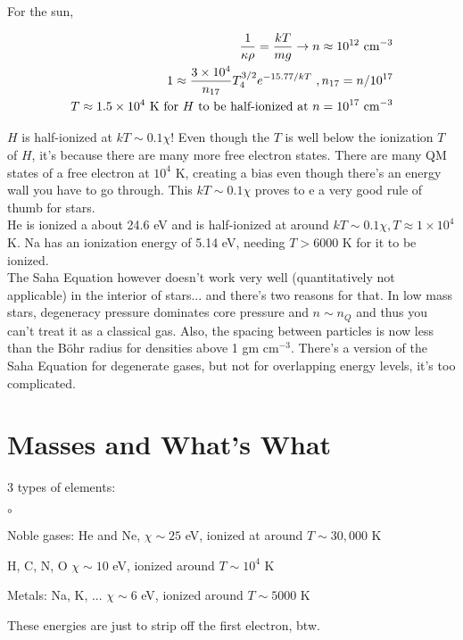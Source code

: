 For the sun,

\begin{align}
\frac{1}{\kappa \rho} = \frac{kT}{mg} \rightarrow n\approx 10^{12} \text{ cm}^{-3}\\
1 \approx \frac{3 \times 10^4}{n_{17}}T_4^{3/2} e^{-15.77 /kT}~,n_{17} = n/10^{17}\\
T \approx 1.5 \times 10^4 \text{ K for $H$ to be half-ionized at $n = 10^{17}$ cm$^{-3}$}
\end{align}

$H$ is half-ionized at $kT \sim 0.1 \chi$! Even though the $T$ is well below the ionization $T$ of $H$, it's because there are many more free electron states. There are many QM states of a free electron at $10^4$ K, creating a bias even though there's an energy wall you have to go through. This  $kT \sim 0.1 \chi$ proves to e a very good rule of thumb for stars. \\

He is ionized a about 24.6 eV and is half-ionized at around $kT \sim 0.1 \chi, T \approx 1 \times 10^4$ K. Na has an ionization energy of 5.14 eV, needing $T > 6000$ K for it to be ionized. \\

The Saha Equation however doesn't work very well (quantitatively not applicable) in the interior of stars... and there's two reasons for that. In low mass stars, degeneracy pressure dominates core pressure and $n \sim n_Q$ and thus you can't treat it as a classical gas. Also, the spacing between particles is now less than the B\"ohr radius for densities above 1 gm cm$^{-3}$. There's a version of the Saha Equation for degenerate gases, but not for overlapping energy levels, it's too complicated.

\section{Masses and What's What }

3 types of elements:
\begin{list}{$\circ$}{}
\item Noble gases: He and Ne, $\chi \sim 25$ eV, ionized at around $T \sim 30,000$ K
\item H, C, N, O $\chi \sim 10$ eV, ionized around $T \sim 10^4$ K
\item Metals: Na, K, ... $\chi \sim 6$ eV, ionized around $T \sim 5000$ K
\end{list} 
These energies are just to strip off the first electron, btw. 


